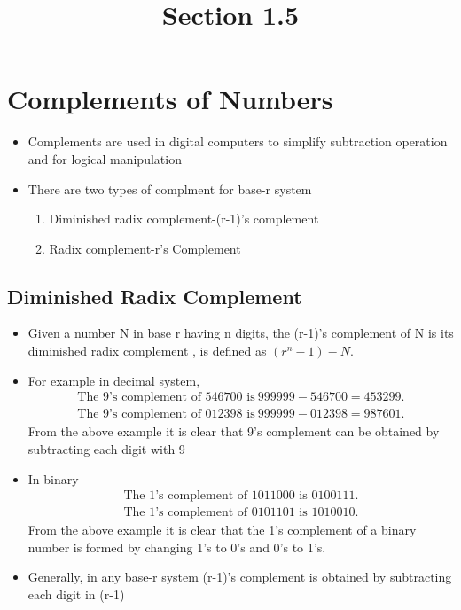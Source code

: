 \documentclass{article}
\begin{document}
\title{Section 1.5}
\author{}
\date{}
\maketitle

\section{Complements of Numbers}
\begin{itemize}
    \item Complements are used in digital computers to simplify subtraction operation and for logical manipulation
    \item There are two types of complment for base-r system
    \begin{enumerate}
        \item Diminished radix complement-(r-1)'s complement
        \item Radix complement-r's Complement
    \end{enumerate}
\end{itemize}
\subsection{Diminished Radix Complement}
\begin{itemize}
    \item Given a number N in base r having n digits, the (r-1)'s complement of N is its diminished radix complement , is defined as $(r^n-1)-N$.
    \item For example in decimal system,
    \begin{align}
        \text{The 9's complement of 546700 is} \ 999999- 546700= 453299.\\
        \text {The 9's complement of 012398 is} \ 999999- 012398= 987601.
    \end{align}
    From the above example it is clear that 9's complement can be obtained by subtracting each digit with 9 
    \item In binary
    \begin{align}
        \text{The 1's complement of 1011000 is 0100111.}\\
        \text{The 1's complement of 0101101 is 1010010.}
    \end{align}
    From the above example it is clear that the 1’s complement of a binary number is formed by changing 1’s to 0’s and 0’s to 1’s. 
    \item Generally, in any base-r system (r-1)'s complement is obtained by subtracting each digit in (r-1)
\end{itemize}
\end{document}

